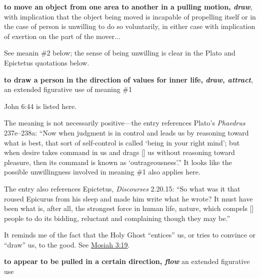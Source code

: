 				\begin{compactdesc}
				
					\item[BDAG 281a] \phantom{.}
						\begin{compactitem}
							\item[1] \textbf{to move an object from one area to another in a pulling motion, \textit{draw}}, with implication that the object being moved is incapable of propelling itself or in the case of person is unwilling to do so voluntarily, in either case with implication of exertion on the part of the mover...
								\begin{compactitem}
									\item See meanin \#2 below; the sense of being unwilling is clear in the Plato and Epictetus quotations below.
								\end{compactitem}
							\item[2] \textbf{to draw a person in the direction of values for inner life, \textit{draw, attract}}, an extended figurative use of meaning \#1
								\begin{compactitem}
									\item John 6:44 is listed here.
									\item The meaning is not necessarily positive---the entry references Plato's \textit{Phaedrus} 237e--238a: ``Now when judgment is in control and leads us by reasoning toward what is best, that sort of self-control is called `being in your right mind'; but when desire takes command in us and drags [] us without reasoning toward pleasure, then its command is known as `outrageousness'.'' It looks like the possible unwillingness involved in meaning \#1 also applies here.
									\item The entry also references Epictetus, \textit{Discourses} 2.20.15: ``So what was it that roused Epicurus from his sleep and made him write what he wrote? It must have been what is, after all, the strongest force in human life, nature, which compels [] people to do its bidding, reluctant and complaining though they may be.''
									\item It reminds me of the fact that the Holy Ghost ``entices'' us, or tries to convince or ``draw'' us, to the good. See \hyperref[MOSIAH-3-19]{Mosiah 3:19}.
								\end{compactitem}
							\item[3] \textbf{to appear to be pulled in a certain direction, \textit{flow}} an extended figurative use
						\end{compactitem}
						

\end{compactdesc}
